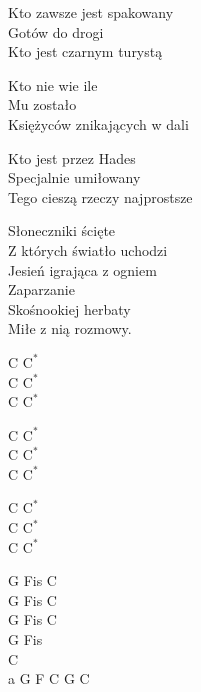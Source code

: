 \begin{textn}
    Kto zawsze jest spakowany\\
    Gotów do drogi\\
    Kto jest czarnym turystą

    Kto nie wie ile\\
    Mu zostało\\
    Księżyców znikających w dali

    Kto jest przez Hades\\
    Specjalnie umiłowany\\
    Tego cieszą rzeczy najprostsze

    Słoneczniki ścięte\\
    Z których światło uchodzi\\
    Jesień igrająca z ogniem\\
    Zaparzanie\\
    Skośnookiej herbaty\\
    Miłe z nią rozmowy.
\end{textn}
\begin{chordw}
    C $\mathrm{C^*}$\\
    C $\mathrm{C^*}$\\
    C $\mathrm{C^*}$

    C $\mathrm{C^*}$\\
    C $\mathrm{C^*}$\\
    C $\mathrm{C^*}$

    C $\mathrm{C^*}$\\
    C $\mathrm{C^*}$\\
    C $\mathrm{C^*}$

    G Fis C\\
    G Fis C\\
    G Fis C\\
    G Fis\\
    C\\
    a G F C G C
\end{chordw}
